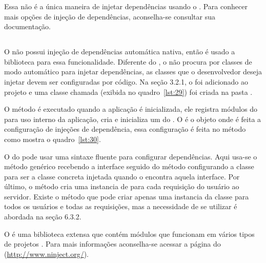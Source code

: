 Essa não é a única maneira de injetar dependências usando o . Para conhecer mais opções de injeção de dependências, aconselha-se consultar sua documentação.

\subsection{}

O  não possui injeção de dependências automática nativa, então é usado a biblioteca  para essa funcionalidade. Diferente do , o  não procura por classes de modo automático para injetar dependências, as classes que o desenvolvedor deseja injetar devem ser configuradas por código. Na seção 3.2.1, o  foi adicionado ao projeto e uma classe chamada  (exibida no quadro~\ref{lst:29}) foi criada na pasta . 


O método  é executado quando a aplicação é inicializada, ele registra módulos do  para uso interno da aplicação, cria e inicializa um  do . O  é o objeto onde é feita a configuração de injeções de dependência, essa configuração é feita no método  como mostra o quadro~\ref{lst:30}.


O  do  pode usar uma sintaxe fluente para configurar dependências. Aqui usa-se o método genérico  recebendo a interface  seguido do método  configurando a classe  para ser a classe concreta injetada quando o  encontra aquela interface. Por último, o método  cria uma instancia de  para cada requisição do usuário ao servidor. Existe o método  que pode criar apenas uma instancia da classe para todos os usuários e todas as requisições, mas a necessidade de se utilizar  é abordada na seção 6.3.2.

O  é uma biblioteca extensa que contém módulos que funcionam em vários tipos de projetos . Para mais informações aconselha-se acessar a página do  (\url{http://www.ninject.org/}).

